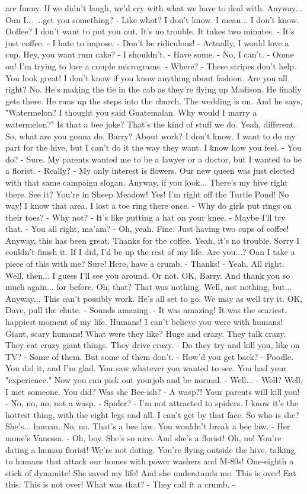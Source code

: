 \documentclass{article}
\begin{document}
are funny. If we didn't laugh, we'd cry with what we have to deal with. Anyway... Oan I... ...get you something? - Like what? I don't know. I mean... I don't know. Ooffee? I don't want to put you out. It's no trouble. It takes two minutes. - It's just coffee. - I hate to impose. - Don't be ridiculous! - Actually, I would love a cup. Hey, you want rum cake? - I shouldn't. - Have some. - No, I can't. - Oome on! I'm trying to lose a couple micrograms. - Where? - These stripes don't help. You look great! I don't know if you know anything about fashion. Are you all right? No. He's making the tie in the cab as they're flying up Madison. He finally gets there. He runs up the steps into the church. The wedding is on. And he says, "Watermelon? I thought you said Guatemalan. Why would I marry a watermelon?" Is that a bee joke? That's the kind of stuff we do. Yeah, different. So, what are you gonna do, Barry? About work? I don't know. I want to do my part for the hive, but I can't do it the way they want. I know how you feel. - You do? - Sure. My parents wanted me to be a lawyer or a doctor, but I wanted to be a florist. - Really? - My only interest is flowers. Our new queen was just elected with that same campaign slogan. Anyway, if you look... There's my hive right there. See it? You're in Sheep Meadow! Yes! I'm right off the Turtle Pond! No way! I know that area. I lost a toe ring there once. - Why do girls put rings on their toes? - Why not? - It's like putting a hat on your knee. - Maybe I'll try that. - You all right, ma'am? - Oh, yeah. Fine. Just having two cups of coffee! Anyway, this has been great. Thanks for the coffee. Yeah, it's no trouble. Sorry I couldn't finish it. If I did, I'd be up the rest of my life. Are you...? Oan I take a piece of this with me? Sure! Here, have a crumb. - Thanks! - Yeah. All right. Well, then... I guess I'll see you around. Or not. OK, Barry. And thank you so much again... for before. Oh, that? That was nothing. Well, not nothing, but... Anyway... This can't possibly work. He's all set to go. We may as well try it. OK, Dave, pull the chute. - Sounds amazing. - It was amazing! It was the scariest, happiest moment of my life. Humans! I can't believe you were with humans! Giant, scary humans! What were they like? Huge and crazy. They talk crazy. They eat crazy giant things. They drive crazy. - Do they try and kill you, like on TV? - Some of them. But some of them don't. - How'd you get back? - Poodle. You did it, and I'm glad. You saw whatever you wanted to see. You had your "experience." Now you can pick out yourjob and be normal. - Well... - Well? Well, I met someone. You did? Was she Bee-ish? - A wasp?! Your parents will kill you! - No, no, no, not a wasp. - Spider? - I'm not attracted to spiders. I know it's the hottest thing, with the eight legs and all. I can't get by that face. So who is she? She's... human. No, no. That's a bee law. You wouldn't break a bee law. - Her name's Vanessa. - Oh, boy. She's so nice. And she's a florist! Oh, no! You're dating a human florist! We're not dating. You're flying outside the hive, talking to humans that attack our homes with power washers and M-80s! One-eighth a stick of dynamite! She saved my life! And she understands me. This is over! Eat this. This is not over! What was that? - They call it a crumb. - 
\end{document}
